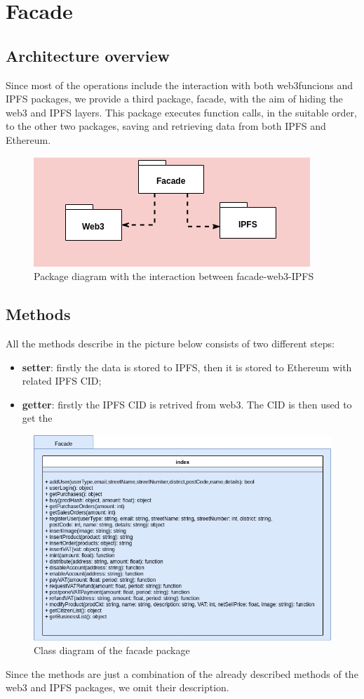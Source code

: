 \section{Facade} 

\subsection{Architecture overview}

Since most of the operations include the interaction with both web3funcions and IPFS packages, we provide a third package, facade, with the aim of hiding the web3 and IPFS layers. This package executes function calls, in the suitable order, to the other two packages, saving and retrieving data from both IPFS and Ethereum.

\begin{figure}[h]
	\centering
	\includegraphics[scale=0.6]{res/images/facade.png}
	\caption{Package diagram with the interaction between facade-web3-IPFS}
\end{figure}

\subsection{Methods}

All the methods describe in the picture below consists of two different steps:
\begin{itemize}
	\item \textbf{setter}: firstly the data is stored to IPFS, then it is stored to Ethereum with related IPFS CID;
	\item \textbf{getter}: firstly the IPFS CID is retrived from web3. The CID is then used to get the 
\end{itemize}
\begin{figure}[H]
	\centering
	\includegraphics[scale=0.55]{res/images/facade-package.png}
	\caption{Class diagram of the facade package}
\end{figure}

\noindent Since the methods are just a combination of the already described methods of the web3 and IPFS packages, we omit their description.

